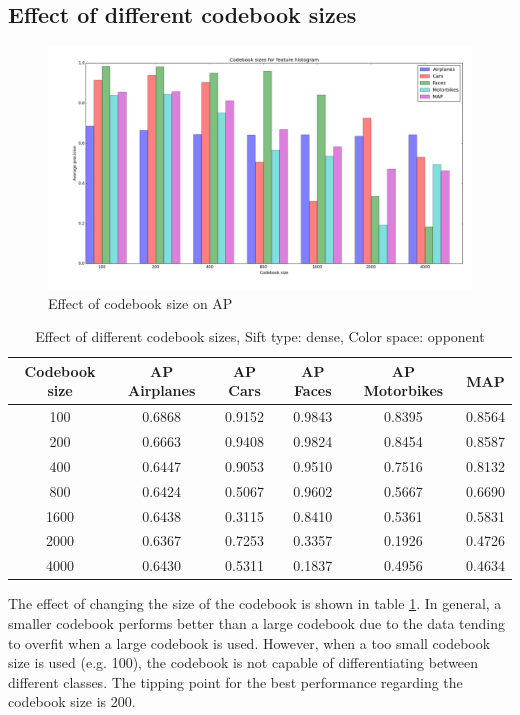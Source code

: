 \subsection{Effect of different codebook sizes}

\begin{figure}[H]
\includegraphics[width=\textwidth]{../plots/cluster_size_feature_histograms}
\caption{Effect of codebook size on AP}
\end{figure}
\begin{table}[H]
\begin{tabular}{|c|ccccc|}
\hline
\textbf{Codebook size} & \textbf{AP Airplanes} & \textbf{AP Cars} & \textbf{AP Faces} & \textbf{AP Motorbikes} & \textbf{MAP}\\
\hline
100& 0.6868 & 0.9152 & 0.9843 & 0.8395 & 0.8564\\
200 & 0.6663 & 0.9408 & 0.9824 & 0.8454 & 0.8587\\
400 & 0.6447 & 0.9053 & 0.9510 & 0.7516 & 0.8132\\
800 & 0.6424 & 0.5067 & 0.9602 & 0.5667 & 0.6690\\
1600 & 0.6438 & 0.3115 & 0.8410 & 0.5361 & 0.5831\\
2000 & 0.6367 & 0.7253 & 0.3357 & 0.1926 & 0.4726\\
4000 & 0.6430 & 0.5311 & 0.1837 & 0.4956 & 0.4634\\
\hline
\end{tabular}
\caption{Effect of different codebook sizes, Sift type: dense, Color space: opponent}
\label{tab:clusters}
\end{table}

The effect of changing the size of the codebook is shown in table \ref{tab:clusters}. In general, a smaller codebook performs better than a large codebook due to the data tending to overfit when a large codebook is used. However, when a too small codebook size is used (e.g. 100), the codebook is not capable of differentiating between different classes. The tipping point for the best performance regarding the codebook size is 200.